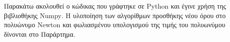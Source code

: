 \documentclass[assignment3.tex]{subfiles}
\begin{document}
Παρακάτω ακολουθεί ο κώδικας που γράφτηκε σε \textlatin{Python} και έγινε χρήση της βιβλιοθήκης \textlatin{Numpy}. Η υλοποίηση των αλγορίθμων προσθήκης νέου όρου στο πολυώνυμο \textlatin{Newton} και φωλιασμένου υπολογισμού της τιμής του πολυωνύμου δίνονται στο Παράρτημα.

\end{document}
